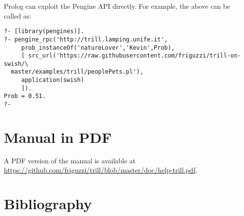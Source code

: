 \documentclass[a4paper,10pt]{scrartcl}
\begin{document}
Prolog can exploit the Pengine API directly.  For example, the above can
be called as:
\begin{verbatim}
?- [library(pengines)].
?- pengine_rpc('http://trill.lamping.unife.it',
     prob_instanceOf('natureLover','Kevin',Prob),
     [ src_url('https://raw.githubusercontent.com/friguzzi/trill-on-swish/\
  master/examples/trill/peoplePets.pl'),
     application(swish)
     ]).
Prob = 0.51.
?-
\end{verbatim}

\section{Manual in PDF}
A PDF version of the manual is available at
\url{https://github.com/friguzzi/trill/blob/master/doc/help-trill.pdf}.
\section{Bibliography}


\end{document}
